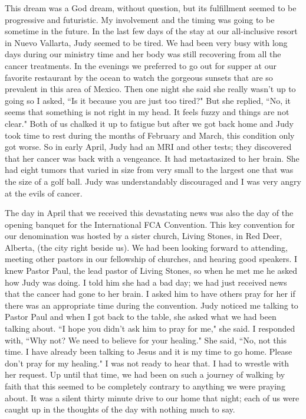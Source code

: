 \documentclass[oneside,12pt]{book}
\begin{document}
This dream was a God dream, without question, but its fulfillment seemed to be progressive and futuristic. My involvement and the timing was going to be sometime in the future. In the last few days of the stay at our all-inclusive resort in Nuevo Vallarta, Judy seemed to be tired. We had been very busy with long days during our ministry time and her body was still recovering from all the cancer treatments. In the evenings we preferred to go out for supper at our favorite restaurant by the ocean to watch the gorgeous sunsets that are so prevalent in this area of Mexico. Then one night she said she really wasn't up to going so I asked, ``Is it because you are just too tired?" But she replied, ``No, it seems that something is not right in my head. It feels fuzzy and things are not clear." Both of us chalked it up to fatigue but after we got back home and Judy took time to rest during the months of February and March, this condition only got worse. So in early April, Judy had an MRI and other tests; they discovered that her cancer was back with a vengeance. It had metastasized to her brain. She had eight tumors that varied in size from very small to the largest one that was the size of a golf ball. Judy was understandably discouraged and I was very angry at the evils of cancer. 

The day in April that we received this devastating news was also the day of the opening banquet for the International FCA Convention. This key convention for our denomination was hosted by a sister church, Living Stones, in Red Deer, Alberta, (the city right beside us). We had been looking forward to attending, meeting other pastors in our fellowship of churches, and hearing good speakers. I knew Pastor Paul, the lead pastor of Living Stones, so when he met me he asked how Judy was doing. I told him she had a bad day; we had just received news that the cancer had gone to her brain. I asked him to have others pray for her if there was an appropriate time during the convention. Judy noticed me talking to Pastor Paul and when I got back to the table, she asked what we had been talking about. ``I hope you didn't ask him to pray for me," she said. I responded with, ``Why not? We need to believe for your healing." She said, ``No, not this time. I have already been talking to Jesus and it is my time to go home. Please don't pray for my healing." I was not ready to hear that. I had to wrestle with her request. Up until that time, we had been on such a journey of walking by faith that this seemed to be completely contrary to anything we were praying about. It was a silent thirty minute drive to our home that night; each of us were caught up in the thoughts of the day with nothing much to say.
\end{document}
